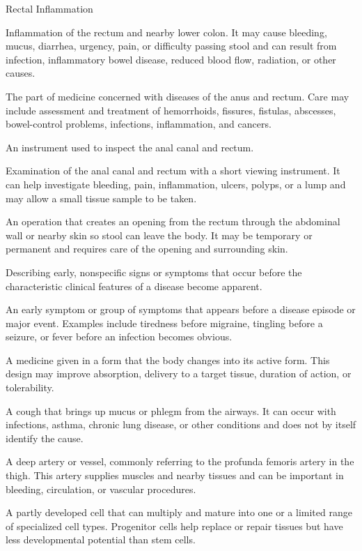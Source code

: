 \synonyms
Rectal Inflammation

 Inflammation of the rectum and nearby lower colon. It may cause bleeding, mucus, diarrhea, urgency, pain, or difficulty passing stool and can result from infection, inflammatory bowel disease, reduced blood flow, radiation, or other causes.

 The part of medicine concerned with diseases of the anus and rectum. Care may include assessment and treatment of hemorrhoids, fissures, fistulas, abscesses, bowel-control problems, infections, inflammation, and cancers.

 An instrument used to inspect the anal canal and rectum.

 Examination of the anal canal and rectum with a short viewing instrument. It can help investigate bleeding, pain, inflammation, ulcers, polyps, or a lump and may allow a small tissue sample to be taken.

 An operation that creates an opening from the rectum through the abdominal wall or nearby skin so stool can leave the body. It may be temporary or permanent and requires care of the opening and surrounding skin.

 Describing early, nonspecific signs or symptoms that occur before the characteristic clinical features of a disease become apparent.

 An early symptom or group of symptoms that appears before a disease episode or major event. Examples include tiredness before migraine, tingling before a seizure, or fever before an infection becomes obvious.

 A medicine given in a form that the body changes into its active form. This design may improve absorption, delivery to a target tissue, duration of action, or tolerability.

 A cough that brings up mucus or phlegm from the airways. It can occur with infections, asthma, chronic lung disease, or other conditions and does not by itself identify the cause.

 A deep artery or vessel, commonly referring to the profunda femoris artery in the thigh. This artery supplies muscles and nearby tissues and can be important in bleeding, circulation, or vascular procedures.

 A partly developed cell that can multiply and mature into one or a limited range of specialized cell types. Progenitor cells help replace or repair tissues but have less developmental potential than stem cells.

